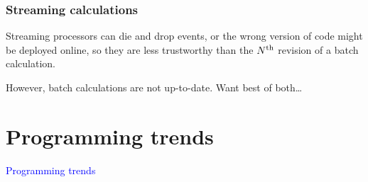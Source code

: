 \documentclass[compress]{beamer}
\begin{document}
\begin{frame}
\frametitle{Streaming calculations}

Streaming processors can die and drop events, or the wrong version of code might be deployed online, so they are less trustworthy than the $N^{\mbox{\scriptsize th}}$ revision of a batch calculation.

\vspace{0.2 cm}
However, batch calculations are not up-to-date. Want best of both\ldots

\end{frame}

\section*{Programming trends}
\begin{frame}
\begin{center}
\Huge \textcolor{blue}{Programming trends}
\end{center}
\end{frame}
\end{document}
